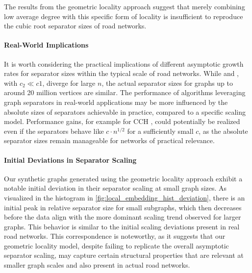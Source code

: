 The results from the geometric locality approach suggest that merely combining low average degree with this specific form of locality is insufficient to reproduce the cubic root separator sizes of road networks.

\paragraph{Real-World Implications}

It is worth considering the practical implications of different asymptotic growth rates for separator sizes within the typical scale of road networks.
While  and , with \(c_2 \ll c1\), diverge for large \(n\), the actual separator sizes for graphs up to around 20 million vertices are similar.
The performance of algorithms leveraging graph separators in real-world applications may be more influenced by the absolute sizes of separators achievable in practice, compared to a specific scaling model.
Performance gains, for example for CCH \cite{dibbelt_customizable_2016}, could potentially be realized even if the separators behave like \(c \cdot n^{1/2}\) for a sufficiently small \(c\), as the absolute separator sizes remain manageable for networks of practical relevance.

\paragraph{Initial Deviations in Separator Scaling}

Our synthetic graphs generated using the geometric locality approach exhibit a notable initial deviation in their separator scaling at small graph sizes.
As visualized in the histogram in \cref{fig:local_embedding_hist_deviation}, there is an initial peak in relative separator size for small subgraphs, which then decreases before the data align with the more dominant scaling trend observed for larger graphs.
This behavior is similar to the initial scaling deviations present in real road networks.
This correspondence is noteworthy, as it suggests that our geometric locality model, despite failing to replicate the overall asymptotic separator scaling, may capture certain structural properties that are relevant at smaller graph scales and also present in actual road networks.


